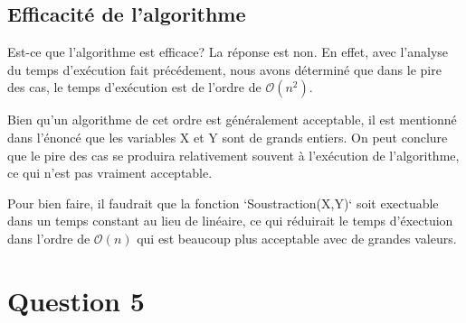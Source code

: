 \documentclass[12pt]{article}
\begin{document}
   \subsection*{Efficacité de l'algorithme}
   	Est-ce que l'algorithme est efficace? La réponse est non. En effet, avec
   	l'analyse du temps d'exécution fait précédement, nous avons déterminé
   	que dans le pire des cas, le temps d'exécution est de l'ordre 
   	de \( \mathcal{O}(n^2) \). \newline
   	
   	Bien qu'un algorithme de cet ordre est généralement acceptable, 
   	il est mentionné dans l'énoncé que les variables X et Y sont de grands 
   	entiers. On peut conclure que le pire des cas se produira relativement
   	 souvent à l'exécution de l'algorithme, ce qui n'est pas vraiment acceptable. \newline
   	 
   	 Pour bien faire, il faudrait que la fonction `Soustraction(X,Y)` soit exectuable
   	 dans un temps constant au lieu de linéaire, ce qui réduirait le temps d'éxectuion
   	 dans l'ordre de \( \mathcal{O}(n) \) qui est beaucoup plus acceptable avec
   	 de grandes valeurs. 
   	
  \newpage

  \section*{Question 5}

  \newpage
\end{document}
